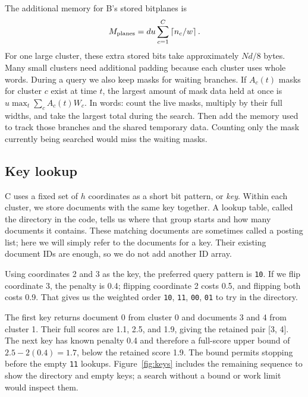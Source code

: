 The additional memory for B's stored bitplanes is
\begin{equation}
M_{\rm planes}=du\sum_{c=1}^{C}\left\lceil n_c/w\right\rceil.
\label{eq:planes}
\end{equation}
For one large cluster, these extra stored bits take approximately $Nd/8$ bytes. Many small
clusters need additional padding because each cluster uses whole words. During a query we
also keep masks for waiting branches. If $A_c(t)$ masks for cluster $c$ exist at time $t$,
the largest amount of mask data held at once is $u\max_t\sum_c A_c(t)W_c$. In words: count
the live masks, multiply by their full widths, and take the largest total during the search.
Then add the memory used to track those branches and the shared temporary data. Counting only
the mask currently being searched would miss the waiting masks.

\subsection{Key lookup}
C uses a fixed set of $h$ coordinates as a short bit pattern, or \emph{key}. Within each
cluster, we store documents with the same key together. A lookup table, called the directory
in the code, tells us where that group starts and how many documents it contains. These
matching documents are sometimes called a posting list; here we will simply refer to the
documents for a key. Their existing document IDs are enough, so we do not add another ID array.

Using coordinates 2 and 3 as the key, the preferred query pattern is \texttt{10}.
If we flip coordinate 3, the penalty is 0.4; flipping coordinate 2 costs 0.5, and flipping
both costs 0.9. That gives us the weighted order \texttt{10}, \texttt{11}, \texttt{00},
\texttt{01} to try in the directory.


The first key returns document 0 from cluster 0 and documents 3 and 4 from cluster 1. Their
full scores are 1.1, 2.5, and 1.9, giving the retained pair [3, 4]. The next key has known
penalty 0.4 and therefore a full-score upper bound of $2.5-2(0.4)=1.7$, below the retained
score 1.9. The bound permits stopping before the empty \texttt{11} lookups.
Figure~\ref{fig:keys} includes the remaining sequence to show the directory and empty keys;
a search without a bound or work limit would inspect them.

